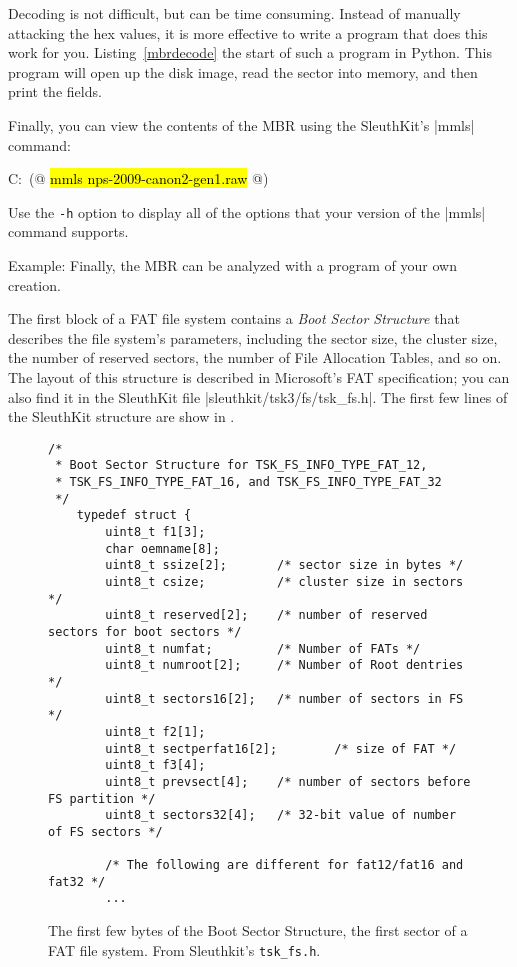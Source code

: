 Decoding is not difficult, but can be time consuming. Instead of
manually attacking the hex values, it is more effective to write a
program that does this work for you. Listing~\ref{mbrdecode} the start
of such a program in Python. This program  will open
up the disk image, read the sector into memory, and then print the
fields. 

\label{mbrdecode}


Finally, you can view the contents of the MBR using the SleuthKit's |mmls| command:


\begin{code}
C:\ (@ \hl{mmls nps-2009-canon2-gen1.raw} @)
\end{code}

Use the \texttt{-h} option to display all of the options that your
version of the |mmls| command supports.

Example: Finally, the MBR can be analyzed with a program of your own
creation. 


The first block of a FAT file system contains a \emph{Boot Sector
  Structure} that describes the file system's parameters, including
the sector size, the cluster size, the number of reserved sectors, the
number of File Allocation Tables, and so on. The layout of this
structure is described in Microsoft's FAT specification; you can also
find it in the SleuthKit file |sleuthkit/tsk3/fs/tsk_fs.h|. The first
few lines of the SleuthKit structure are show in .

\begin{figure}
\begin{lstlisting}
/*
 * Boot Sector Structure for TSK_FS_INFO_TYPE_FAT_12,
 * TSK_FS_INFO_TYPE_FAT_16, and TSK_FS_INFO_TYPE_FAT_32
 */
    typedef struct {
        uint8_t f1[3];
        char oemname[8];
        uint8_t ssize[2];       /* sector size in bytes */
        uint8_t csize;          /* cluster size in sectors */
        uint8_t reserved[2];    /* number of reserved sectors for boot sectors */
        uint8_t numfat;         /* Number of FATs */
        uint8_t numroot[2];     /* Number of Root dentries */
        uint8_t sectors16[2];   /* number of sectors in FS */
        uint8_t f2[1];
        uint8_t sectperfat16[2];        /* size of FAT */
        uint8_t f3[4];
        uint8_t prevsect[4];    /* number of sectors before FS partition */
        uint8_t sectors32[4];   /* 32-bit value of number of FS sectors */

        /* The following are different for fat12/fat16 and fat32 */
        ...
\end{lstlisting}
\caption{The first few bytes of the Boot Sector Structure, the first
  sector of a FAT file system. From Sleuthkit's \texttt{tsk\_fs.h}.\label{BSS}}
\end{figure}

